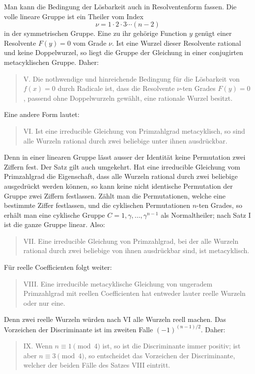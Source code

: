 \documentclass[11pt]{article}
\begin{document}
Man kann die Bedingung der Lösbarkeit auch in Resolventenform fassen. Die volle lineare Gruppe ist ein Theiler vom Index
\[
  \nu=1\cdot2\cdot3\cdots(n-2)
\]
in der symmetrischen Gruppe. Eine zu ihr gehörige Function $y$ genügt einer Resolvente $F(y)=0$ vom Grade $\nu$. Ist eine Wurzel dieser Resolvente rational und keine Doppelwurzel, so liegt die Gruppe der Gleichung in einer conjugirten metacyklischen Gruppe. Daher:
\begin{quote}
V. Die nothwendige und hinreichende Bedingung für die Lösbarkeit von $f(x)=0$ durch Radicale ist, dass die Resolvente $\nu$-ten Grades $F(y)=0$, passend ohne Doppelwurzeln gewählt, eine rationale Wurzel besitzt.
\end{quote}

Eine andere Form lautet:
\begin{quote}
VI. Ist eine irreducible Gleichung von Primzahlgrad metacyklisch, so sind alle Wurzeln rational durch zwei beliebige unter ihnen ausdrückbar.
\end{quote}
Denn in einer linearen Gruppe lässt ausser der Identität keine Permutation zwei Ziffern fest. Der Satz gilt auch umgekehrt. Hat eine irreducible Gleichung vom Primzahlgrad die Eigenschaft, dass alle Wurzeln rational durch zwei beliebige ausgedrückt werden können, so kann keine nicht identische Permutation der Gruppe zwei Ziffern festlassen. Zählt man die Permutationen, welche eine bestimmte Ziffer festlassen, und die cyklischen Permutationen $n$-ten Grades, so erhält man eine cyklische Gruppe $C=1,\gamma,\ldots,\gamma^{n-1}$ als Normaltheiler; nach Satz I ist die ganze Gruppe linear. Also:
\begin{quote}
VII. Eine irreducible Gleichung von Primzahlgrad, bei der alle Wurzeln rational durch zwei beliebige von ihnen ausdrückbar sind, ist metacyklisch.
\end{quote}

Für reelle Coefficienten folgt weiter:
\begin{quote}
VIII. Eine irreducible metacyklische Gleichung von ungeradem Primzahlgrad mit reellen Coefficienten hat entweder lauter reelle Wurzeln oder nur eine.
\end{quote}
Denn zwei reelle Wurzeln würden nach VI alle Wurzeln reell machen. Das Vorzeichen der Discriminante ist im zweiten Falle $(-1)^{(n-1)/2}$. Daher:
\begin{quote}
IX. Wenn $n\equiv1\pmod4$ ist, so ist die Discriminante immer positiv; ist aber $n\equiv3\pmod4$, so entscheidet das Vorzeichen der Discriminante, welcher der beiden Fälle des Satzes VIII eintritt.
\end{quote}
\end{document}
